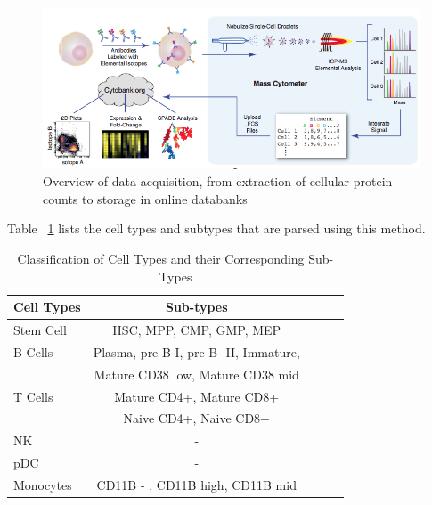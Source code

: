 \documentclass{article}
\begin{document}
\begin{figure}[ht]
\label{DataAcquisition}
\vskip 0.2in
\begin{center}
\centerline{\includegraphics[width=\columnwidth]{DataAcquisition}}
\caption{Overview of data acquisition, from extraction of cellular protein counts to storage in online databanks}
\end{center}
\vskip -0.2in
\end{figure} 

Table ~\ref{table_cell_type} lists the cell types and subtypes that are parsed using this method. 

\begin{table}[tb]
\caption{Classification of Cell Types and their Corresponding Sub-Types}
\label{table_cell_type}
\vskip 0.15in
\begin{center}
\begin{small}
\begin{sc}
\begin{tabular}{lcccr}
\hline
\abovespace\belowspace
Cell Types & Sub-types  \\
\hline
\abovespace
Stem Cell	&  HSC, MPP, CMP, GMP, MEP \\
B Cells 	& Plasma, pre-B-I, pre-B- II, Immature, \\ 
		&			Mature CD38 low, Mature CD38 mid\\
T Cells	& Mature CD4+, Mature CD8+ \\
		& Naive CD4+, Naive CD8+  \\
NK		& -   \\
pDC		& - \\
\belowspace
Monocytes & CD11B - , CD11B high, CD11B mid \\
\hline
\end{tabular}
\end{sc}
\end{small}
\end{center}
\vskip -0.1in
\end{table}
\end{document}
